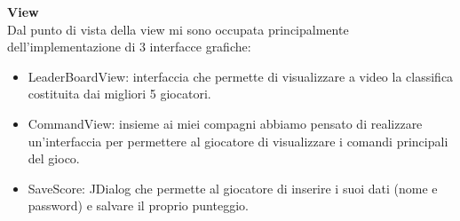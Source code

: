 \documentclass[a4paper,12pt]{report}
\begin{document}
\pagebreak

\textbf{View}\\
Dal punto di vista della view mi sono occupata principalmente dell'implementazione di 3 interfacce grafiche:\\
\begin{itemize}
    \item LeaderBoardView: interfaccia che permette di visualizzare a video la classifica costituita dai migliori 5 giocatori.
    \item CommandView: insieme ai miei compagni abbiamo pensato di realizzare un'interfaccia per permettere al giocatore di visualizzare i comandi principali del gioco.
    \item SaveScore: JDialog che permette al giocatore di inserire i suoi dati (nome e password) e salvare il proprio punteggio.
\end{itemize}
\pagebreak
\end{document}
